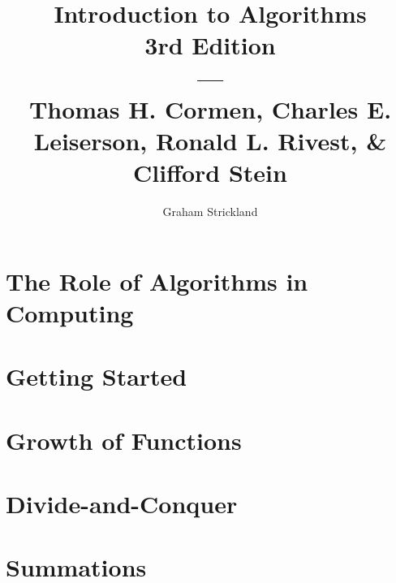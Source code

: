 \documentclass{article}
\title{
  Introduction to Algorithms\\3rd Edition\\---\\
  Thomas H. Cormen, Charles E. Leiserson, Ronald L. Rivest, \& Clifford Stein
}
\author{Graham Strickland}
\numberwithin{equation}{subsection}
\begin{document}
\maketitle

\tableofcontents

\newpage

\section{The Role of Algorithms in Computing}


\section{Getting Started}


\section{Growth of Functions}


\section{Divide-and-Conquer}


\appendix

\section{Summations}

\end{document}
